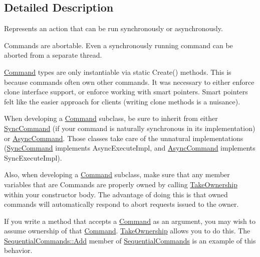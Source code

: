 \subsection{Detailed Description}
Represents an action that can be run synchronously or asynchronously.

Commands are abortable. Even a synchronously running command can be aborted from a separate thread. 

\mbox{\hyperlink{class_command_lib_1_1_command}{Command}} types are only instantiable via static Create() methods. This is because commands often own other commands. It was necessary to either enforce clone interface support, or enforce working with smart pointers. Smart pointers felt like the easier approach for clients (writing clone methods is a nuisance). 

When developing a \mbox{\hyperlink{class_command_lib_1_1_command}{Command}} subclass, be sure to inherit from either \mbox{\hyperlink{class_command_lib_1_1_sync_command}{Sync\+Command}} (if your command is naturally synchronous in its implementation) or \mbox{\hyperlink{class_command_lib_1_1_async_command}{Async\+Command}}. Those classes take care of the unnatural implementations (\mbox{\hyperlink{class_command_lib_1_1_sync_command}{Sync\+Command}} implements Async\+Execute\+Impl, and \mbox{\hyperlink{class_command_lib_1_1_async_command}{Async\+Command}} implements Sync\+Execute\+Impl). 

Also, when developing a \mbox{\hyperlink{class_command_lib_1_1_command}{Command}} subclass, make sure that any member variables that are Commands are properly owned by calling \mbox{\hyperlink{class_command_lib_1_1_command_a0787e7b79c5424926be5c1c8be1ebb0d}{Take\+Ownership}} within your constructor body. The advantage of doing this is that owned commands will automatically respond to abort requests issued to the owner. 

If you write a method that accepts a \mbox{\hyperlink{class_command_lib_1_1_command}{Command}} as an argument, you may wish to assume ownership of that \mbox{\hyperlink{class_command_lib_1_1_command}{Command}}. \mbox{\hyperlink{class_command_lib_1_1_command_a0787e7b79c5424926be5c1c8be1ebb0d}{Take\+Ownership}} allows you to do this. The \mbox{\hyperlink{class_command_lib_1_1_sequential_commands_af0100e15f7897471ce84802ab6c25e00}{Sequential\+Commands\+::\+Add}} member of \mbox{\hyperlink{class_command_lib_1_1_sequential_commands}{Sequential\+Commands}} is an example of this behavior. 


